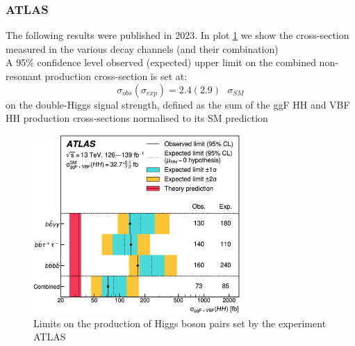 \subsubsection{ATLAS}
The following results were published in 2023\cite{atlas_combined}. In plot \ref{atlas_results} we show the cross-section measured in the various decay channels (and their combination)\\
A 95\% confidence level observed (expected) upper limit on the combined non-resonant production cross-section is set at:
\begin{equation}
        \sigma_{obs} \left(\sigma_{exp}\right) = 2.4 (2.9)\text{  }\sigma_{SM}
\end{equation}
on the double-Higgs signal strength, defined as the sum of the ggF HH and VBF HH production cross-sections normalised to its SM prediction
\begin{figure}[ht]
    \centering
        \includegraphics[width=0.7\textwidth]{images/atlas_expected.png}   
    \caption{Limits on the production of Higgs boson pairs set by the experiment ATLAS}
    \label{atlas_results}  
\end{figure}